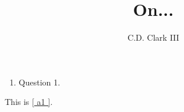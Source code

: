 \documentclass[]{article}
\author{C.D. Clark III}
\title{On...}
\begin{document}
\maketitle


\begin{enumerate}
  \item \label{ a1 } Question 1.
\end{enumerate}

This is \ref{ a1 }.
\end{document}
